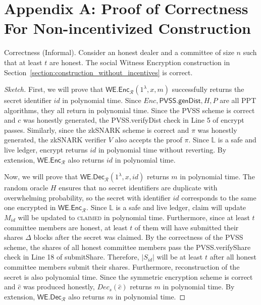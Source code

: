\section{Appendix A: Proof of Correctness For Non-incentivized Construction}
\begin{theorem}{Correctness (Informal).}\label{thm:correctness_hm_appendix}
    Consider an honest dealer and a committee of size $n$ such that at least $t$ are honest.
    The social Witness Encryption construction in Section~\ref{section:construction_without_incentives} is correct.
\end{theorem}
\begin{proof}[Sketch]
    First, we will prove that $\textsf{WE.Enc}_\mathcal{R}(1^{\lambda}, x, m)$ successfully returns the secret identifier $id$ in polynomial time.
    Since $Enc, \textsf{PVSS.genDist}, H, P$ are all PPT algorithms, they all return in polynomial time.
    Since the PVSS scheme is correct and $c$ was honestly generated, the \textsf{PVSS.verifyDist} check in Line 5 of \textsf{encrypt} passes.
    Similarly, since the zkSNARK scheme is correct and $\pi$ was honestly generated, the zkSNARK verifier $V$ also accepts the proof $\pi$.
    Since $\mathbb{L}$ is a safe and live ledger, \textsf{encrypt} returns $id$ in polynomial time without reverting.
    By extension, $\textsf{WE.Enc}_\mathcal{R}$ also returns $id$ in polynomial time.

    Now, we will prove that $\textsf{WE.Dec}_\mathcal{R}(1^{\lambda}, x, id)$ returns $m$ in polynomial time.
    The random oracle $H$ ensures that no secret identifiers are duplicate with overwhelming probability, so the secret with identifier $id$ corresponds to the same one encrypted in $\textsf{WE.Enc}_\mathcal{R}$.
    Since $\mathbb{L}$ is a safe and live ledger, \textsf{claim} will update $M_{id}$ will be updated to \textsc{claimed} in polynomial time.
    Furthermore, since at least $t$ committee members are honest, at least $t$ of them will have submitted their shares $\Delta$ blocks after the secret was claimed.
    By the correctness of the PVSS scheme, the shares of all honest committee members pass the \textsf{PVSS.verifyShare} check in Line 18 of \textsf{submitShare}.
    Therefore, $|S_{id}|$ will be at least $t$ after all honest committee members submit their shares.
    Furthermore, reconstruction of the secret is also polynomial time.
    Since the symmetric encryption scheme is correct and $\hat{c}$ was produced honestly, $Dec_s(\hat{c})$ returns $m$ in polynomial time.
    By extension, $\textsf{WE.Dec}_\mathcal{R}$ also returns $m$ in polynomial time.
\end{proof}

